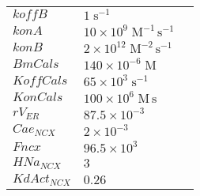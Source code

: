 \documentclass[a4paper,10.0pt]{article}
\begin{document}
{\begin{longtabu}{| l l l |}
  $koffB$\hspace{0.5cm} & $1\;\mathrm{s}^{-1}$\hspace{0.5cm} & \hspace{0.5cm}\\
  $konA$\hspace{0.5cm} & $10\!\times\!10 ^{9}\;\mathrm{M}^{-1}\,\mathrm{s}^{-1}$\hspace{0.5cm} & \hspace{0.5cm}\\
  $konB$\hspace{0.5cm} & $2\!\times\!10 ^{12}\;\mathrm{M}^{-2}\,\mathrm{s}^{-1}$\hspace{0.5cm} & \hspace{0.5cm}\\
  $BmCals$\hspace{0.5cm} & $140\!\times\!10 ^{-6}\;\mathrm{M}$\hspace{0.5cm} & \hspace{0.5cm}\\
  $KoffCals$\hspace{0.5cm} & $65\!\times\!10 ^{3}\;\mathrm{s}^{-1}$\hspace{0.5cm} & \hspace{0.5cm}\\
  $KonCals$\hspace{0.5cm} & $100\!\times\!10 ^{6}\;\mathrm{M}\,\mathrm{s}$\hspace{0.5cm} & \hspace{0.5cm}\\
  $rV_{ER}$\hspace{0.5cm} & $87.5\!\times\!10 ^{-3}$\hspace{0.5cm} & \hspace{0.5cm}\\
  $Cae_{NCX}$\hspace{0.5cm} & $2\!\times\!10 ^{-3}$\hspace{0.5cm} & \hspace{0.5cm}\\
  $Fncx$\hspace{0.5cm} & $96.5\!\times\!10 ^{3}$\hspace{0.5cm} & \hspace{0.5cm}\\
  $HNa_{NCX}$\hspace{0.5cm} & $3$\hspace{0.5cm} & \hspace{0.5cm}\\
  $KdAct_{NCX}$\hspace{0.5cm} & $0.26$\hspace{0.5cm} & \hspace{0.5cm}\\

\end{longtabu}}
\end{document}
